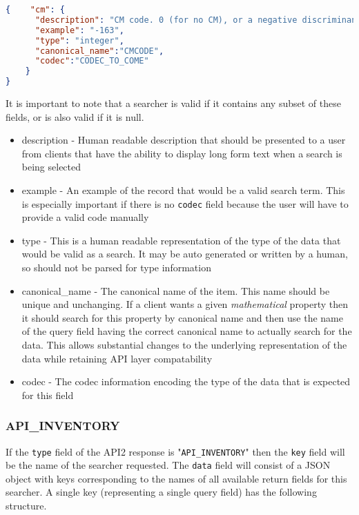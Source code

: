 \documentclass[11pt]{article}
\begin{document}
\begin{lstlisting}[language=json,firstnumber=1]
{    "cm": {
      "description": "CM code. 0 (for no CM), or a negative discriminant", 
      "example": "-163", 
      "type": "integer",
      "canonical_name":"CMCODE",
      "codec":"CODEC_TO_COME"
    }
}
\end{lstlisting}
It is important to note that a searcher is valid if it contains any subset of these fields, or is also valid if it is null.
\begin{itemize}
\item description - Human readable description that should be presented to a user from clients that have the ability to display long form text when a search is being selected
\item example - An example of the record that would be a valid search term. This is especially important if there is no \texttt{codec} field because the user will have to provide a valid code manually
\item type - This is a human readable representation of the type of the data that would be valid as a search. It may be auto generated or written by a human, so should not be parsed for type information
\item canonical\_name - The canonical name of the item. This name should be unique and unchanging. If a client wants a given {\it mathematical} property then it should search for this property by canonical name and then use the name of the query field having the correct canonical name to actually search for the data. This allows substantial changes to the underlying representation of the data while retaining API layer compatability
\item codec - The codec information encoding the type of the data that is expected for this field
\end{itemize}

\subsubsection{API\_INVENTORY}
If the \texttt{type} field of the API2 response is "\texttt{API\_INVENTORY}" then the \texttt{key} field will be the name of the searcher requested. The \texttt{data} field will consist of a JSON object with keys corresponding to the names of all available return fields for this searcher. A single key (representing a single query field) has the following structure.
\end{document}
